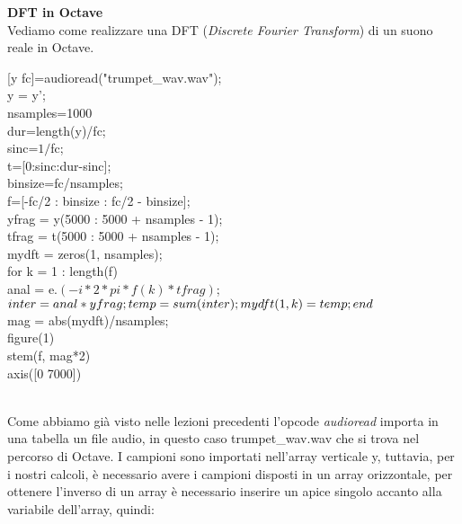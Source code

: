 \documentclass[11pt]{article}
\begin{document}
\begin{multicols*}{2}
\parskip=0pt

\textbf{\textsf {DFT in Octave}}\\

\noindent Vediamo come realizzare una DFT (\textit{Discrete Fourier Transform}) di un suono reale in Octave.

\begin{center}
\begin{minipage}[c]{6.2cm}
\begin{sffamily}
\scriptsize

[y fc]=audioread("trumpet\_wav.wav");\\
y = y'; \\

nsamples=1000\\

dur=length(y)/fc;\\
sinc=$1/$fc;\\
t=[0:sinc:dur-sinc];\\
binsize=fc/nsamples;\\
f=[-fc/2 : binsize : fc/2 - binsize];\\
yfrag = y(5000 : 5000 + nsamples - 1);\\
tfrag = t(5000 : 5000 + nsamples - 1);\\

mydft = zeros(1, nsamples);\\

for k = 1 : length(f)\\
  anal = e.\wedge$(-i * 2 * pi * f(k) * tfrag)$;\\
  $inter = anal  * yfrag;\\
  temp = sum(inter);\\
  mydft(1,k) = temp;\\
end$\\

mag = abs(mydft)/nsamples;\\

figure(1)\\
stem(f, mag*2)\\
axis([0 7000])\\

\end{sffamily}
\end{minipage}
\end{center}\\

Come abbiamo già visto nelle lezioni precedenti l'opcode \textit {audioread} importa in una tabella un file audio, in questo caso trumpet\_wav.wav che si trova nel percorso di Octave. I campioni sono importati nell'array verticale y, tuttavia, per i nostri calcoli, è necessario avere i campioni disposti in un array orizzontale, per ottenere l'inverso di un array è necessario inserire un apice singolo accanto alla variabile dell'array, quindi: 


\end{multicols*}
\end{document}
